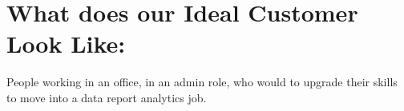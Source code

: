 \section{What does our Ideal Customer Look Like:}

People working in an office, in an admin role, who would to upgrade their skills to move into a data report analytics job.